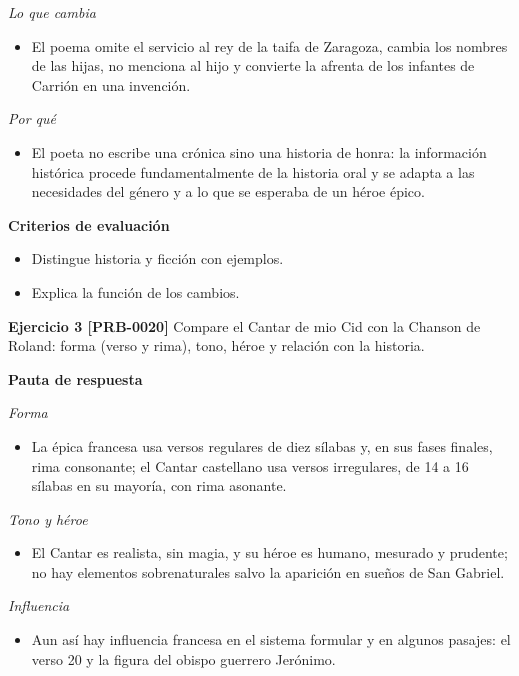 \documentclass{book}
\begin{document}
\noindent\textit{Lo que cambia}
\begin{itemize}
\item El poema omite el servicio al rey de la taifa de Zaragoza, cambia los nombres de las hijas, no menciona al hijo y convierte la afrenta de los infantes de Carrión en una invención.
\end{itemize}

\noindent\textit{Por qué}
\begin{itemize}
\item El poeta no escribe una crónica sino una historia de honra: la información histórica procede fundamentalmente de la historia oral y se adapta a las necesidades del género y a lo que se esperaba de un héroe épico.
\end{itemize}

\noindent\textbf{Criterios de evaluación}
\begin{itemize}
\item Distingue historia y ficción con ejemplos.
\item Explica la función de los cambios.
\end{itemize}

\noindent\textbf{Ejercicio 3 [PRB-0020]}
Compare el Cantar de mio Cid con la Chanson de Roland: forma (verso y rima), tono, héroe y relación con la historia.


\noindent\textbf{Pauta de respuesta}

\noindent\textit{Forma}
\begin{itemize}
\item La épica francesa usa versos regulares de diez sílabas y, en sus fases finales, rima consonante; el Cantar castellano usa versos irregulares, de 14 a 16 sílabas en su mayoría, con rima asonante.
\end{itemize}

\noindent\textit{Tono y héroe}
\begin{itemize}
\item El Cantar es realista, sin magia, y su héroe es humano, mesurado y prudente; no hay elementos sobrenaturales salvo la aparición en sueños de San Gabriel.
\end{itemize}

\noindent\textit{Influencia}
\begin{itemize}
\item Aun así hay influencia francesa en el sistema formular y en algunos pasajes: el verso 20 y la figura del obispo guerrero Jerónimo.
\end{itemize}
\end{document}
